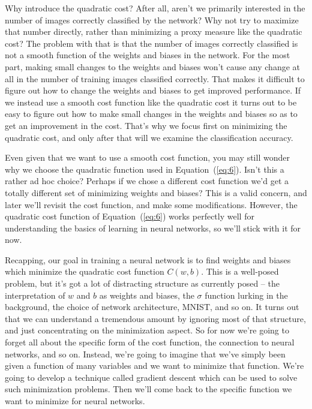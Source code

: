 \documentclass[a4paper,twoside,10pt]{book}
\begin{document}
Why introduce the quadratic cost? After all, aren't we primarily interested in the number of images correctly classified by the network? Why not try to maximize that number directly, rather than minimizing a proxy measure like the quadratic cost? The problem with that is that the number of images correctly classified is not a smooth function of the weights and biases in the network. For the most part, making small changes to the weights and biases won't cause any change at all in the number of training images classified correctly. That makes it difficult to figure out how to change the weights and biases to get improved performance. If we instead use a smooth cost function like the quadratic cost it turns out to be easy to figure out how to make small changes in the weights and biases so as to get an improvement in the cost. That's why we focus first on minimizing the quadratic cost, and only after that will we examine the classification accuracy.

Even given that we want to use a smooth cost function, you may still wonder why we choose the quadratic function used in Equation~(\ref{eq:6}). Isn't this a rather ad hoc choice? Perhaps if we chose a different cost function we'd get a totally different set of minimizing weights and biases? This is a valid concern, and later we'll revisit the cost function, and make some modifications. However, the quadratic cost function of Equation~(\ref{eq:6}) works perfectly well for understanding the basics of learning in neural networks, so we'll stick with it for now.

Recapping, our goal in training a neural network is to find weights and biases which minimize the quadratic cost function $C(w,b)$. This is a well-posed problem, but it's got a lot of distracting structure as currently posed -- the interpretation of $w$ and $b$ as weights and biases, the $\sigma$ function lurking in the background, the choice of network architecture, MNIST, and so on. It turns out that we can understand a tremendous amount by ignoring most of that structure, and just concentrating on the minimization aspect. So for now we're going to forget all about the specific form of the cost function, the connection to neural networks, and so on. Instead, we're going to imagine that we've simply been given a function of many variables and we want to minimize that function. We're going to develop a technique called gradient descent which can be used to solve such minimization problems. Then we'll come back to the specific function we want to minimize for neural networks.
\end{document}
